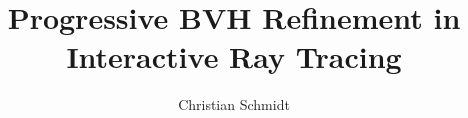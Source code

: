 \documentclass[11pt,a4paper]{article}
\title{Progressive BVH Refinement in Interactive Ray Tracing}
\author{Christian Schmidt}
\begin{document}
\makecover
\maketaskdescription
\makededication
\makeabstract
\maketoc
\cleardoublepage









\end{document}
